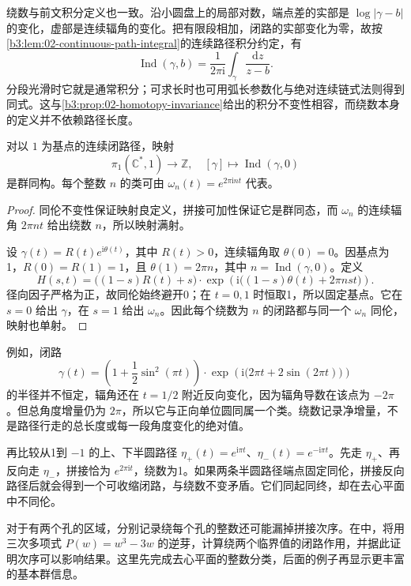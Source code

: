 \ProseParagraphBreak
绕数与前文积分定义也一致。沿小圆盘上的局部对数，端点差的实部是 \(\log|\gamma-b|\) 的变化，虚部是连续辐角的变化。把有限段相加，闭路的实部变化为零，故按\cref{b3:lem:02-continuous-path-integral}的连续路径积分约定，有
\[
 \operatorname{Ind}(\gamma,b)
 =\frac1{2\pi\mathrm i}\int_\gamma\frac{\mathrm dz}{z-b}.
\]
分段光滑时它就是通常积分；可求长时也可用弧长参数化与绝对连续链式法则得到同式。这与\cref{b3:prop:02-homotopy-invariance}给出的积分不变性相容，而绕数本身的定义并不依赖路径长度。

\begin{proposition}\label{b3:prop:09-punctured-fundamental}
对以 \(1\) 为基点的连续闭路径，映射
\[
 \pi_1(\mathbb C^*,1)\longrightarrow\mathbb Z,
 \quad [\gamma]\longmapsto\operatorname{Ind}(\gamma,0)
\]
是群同构。每个整数 \(n\) 的类可由 \(\omega_n(t)=e^{2\pi\mathrm i nt}\) 代表。
\end{proposition}
\begin{proof}
同伦不变性保证映射良定义，拼接可加性保证它是群同态，而 \(\omega_n\) 的连续辐角 \(2\pi nt\) 给出绕数 \(n\)，所以映射满射。

设 \(\gamma(t)=R(t)e^{\mathrm i\theta(t)}\)，其中 \(R(t)>0\)，连续辐角取 \(\theta(0)=0\)。因基点为1，\(R(0)=R(1)=1\)，且 \(\theta(1)=2\pi n\)，其中 \(n=\operatorname{Ind}(\gamma,0)\)。定义
\[
 H(s,t)=\bigl((1-s)R(t)+s\bigr)\cdot
 \exp\!\left(\mathrm i\bigl((1-s)\theta(t)+2\pi nst\bigr)\right).
\]
径向因子严格为正，故同伦始终避开0；在 \(t=0,1\) 时恒取1，所以固定基点。它在 \(s=0\) 给出 \(\gamma\)，在 \(s=1\) 给出 \(\omega_n\)。因此每个绕数为 \(n\) 的闭路都与同一个 \(\omega_n\) 同伦，映射也单射。
\end{proof}
例如，闭路
\[
 \gamma(t)=\left(1+\frac12\sin^2(\pi t)\right)\cdot
 \exp\!\left(\mathrm i\bigl(2\pi t+2\sin(2\pi t)\bigr)\right)
\]
的半径并不恒定，辐角还在 \(t=1/2\) 附近反向变化，因为辐角导数在该点为 \(-2\pi\)。但总角度增量仍为 \(2\pi\)，所以它与正向单位圆同属一个类。绕数记录净增量，不是路径行走的总长度或每一段角度变化的绝对值。

\ProseParagraphBreak
再比较从1到 \(-1\) 的上、下半圆路径 \(\eta_+(t)=e^{\mathrm i\pi t}\)、\(\eta_-(t)=e^{-\mathrm i\pi t}\)。先走 \(\eta_+\)、再反向走 \(\eta_-\)，拼接恰为 \(e^{2\pi\mathrm i t}\)，绕数为1。如果两条半圆路径端点固定同伦，拼接反向路径后就会得到一个可收缩闭路，与绕数不变矛盾。它们同起同终，却在去心平面中不同伦。

\ProseParagraphBreak
对于有两个孔的区域，分别记录绕每个孔的整数还可能漏掉拼接次序。在中，将用三次多项式 \(P(w)=w^3-3w\) 的逆芽，计算绕两个临界值的闭路作用，并据此证明次序可以影响结果。这里先完成去心平面的整数分类，后面的例子再显示更丰富的基本群信息。
